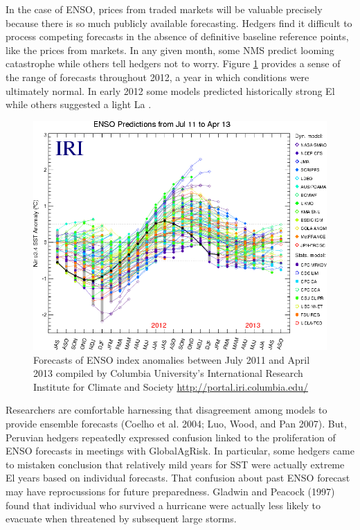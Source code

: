 \documentclass[article]{jss}
\begin{document}
In the case of ENSO, prices from traded markets will be valuable
precisely because there is so much publicly available forecasting.
Hedgers find it difficult to process competing forecasts in the absence
of definitive baseline reference points, like the prices from markets.
In any given month, some NMS predict looming catastrophe while others
tell hedgers not to worry. Figure \ref{fig:IRIENSOconsensusSpread}
provides a sense of the range of forecasts throughout 2012, a year in
which conditions were ultimately normal. In early 2012 some models
predicted historically strong El  while others suggested a
light La .

\begin{figure}
  \includegraphics[width=\linewidth]{img/all_forecasts_IRI_04_2013.png}
  \caption{Forecasts of ENSO index anomalies between July 2011 and April 2013 compiled by Columbia University's International Research Institute for Climate and Society \url{http://portal.iri.columbia.edu/}}
  \label{fig:IRIENSOconsensusSpread}
\end{figure}

Researchers are comfortable harnessing that disagreement among models to
provide ensemble forecasts (Coelho et al. 2004; Luo, Wood, and Pan
2007). But, Peruvian hedgers repeatedly expressed confusion linked to
the proliferation of ENSO forecasts in meetings with GlobalAgRisk. In
particular, some hedgers came to mistaken conclusion that relatively
mild years for  SST were actually extreme El 
years based on individual forecasts. That confusion about past ENSO
forecast may have reprocussions for future preparedness. Gladwin and
Peacock (1997) found that individual who survived a hurricane were
actually less likely to evacuate when threatened by subsequent large
storms.
\end{document}
